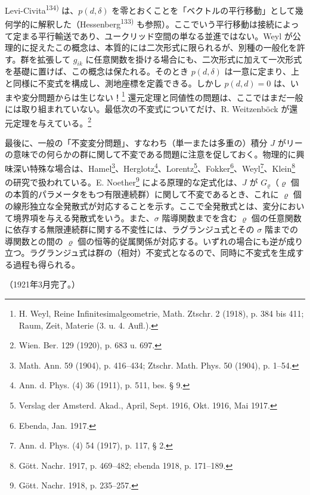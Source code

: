 \documentclass[11pt]{article}
\begin{document}
Levi-Civita\textsuperscript{134)} は、$p(d,\delta)$ を零とおくことを「ベクトルの平行移動」として幾何学的に解釈した（Hessenberg\textsuperscript{133)} も参照）。ここでいう平行移動は接続によって定まる平行輸送であり、ユークリッド空間の単なる並進ではない。Weyl が公理的に捉えたこの概念は、本質的には二次形式に限られるが、別種の一般化を許す。群を拡張して $g_{ik}$ に任意関数を掛ける場合にも、二次形式に加えて一次形式を基礎に置けば、この概念は保たれる。そのとき $p(d,\delta)$ は一意に定まり、上と同様に不変式を構成し、測地座標を定義できる。しかし $p(d,d)=0$ は、いまや変分問題からは生じない！\footnote{H. Weyl, Reine Infinitesimalgeometrie, Math. Ztschr. 2 (1918), p. 384 bis 411; Raum, Zeit, Materie (3. u. 4. Aufl.).} 還元定理と同値性の問題は、ここではまだ一般には取り組まれていない。最低次の不変式についてだけ、R. Weitzenböck が還元定理を与えている。\footnote{Wien. Ber. 129 (1920), p. 683 u. 697.}

最後に、一般の「不変変分問題」、すなわち（単一または多重の）積分 $J$ がリーの意味での何らかの群に関して不変である問題に注意を促しておく。物理的に興味深い特殊な場合は、Hamel\footnote{Math. Ann. 59 (1904), p. 416--434; Ztschr. Math. Phys. 50 (1904), p. 1--54.}、Herglotz\footnote{Ann. d. Phys. (4) 36 (1911), p. 511, bes. § 9.}、Lorentz\footnote{Verslag der Amsterd. Akad., April, Sept. 1916, Okt. 1916, Mai 1917.}、Fokker\footnote{Ebenda, Jan. 1917.}、Weyl\footnote{Ann. d. Phys. (4) 54 (1917), p. 117, § 2.}、Klein\footnote{Gött. Nachr. 1917, p. 469--482; ebenda 1918, p. 171--189.} の研究で扱われている。E. Noether\footnote{Gött. Nachr. 1918, p. 235--257.} による原理的な定式化は、$J$ が $G_\varrho$（$\varrho$ 個の本質的パラメータをもつ有限連続群）に関して不変であるとき、これに $\varrho$ 個の線形独立な全発散式が対応することを示す。ここで全発散式とは、変分において境界項を与える発散式をいう。また、$\sigma$ 階導関数までを含む $\varrho$ 個の任意関数に依存する無限連続群に関する不変性には、ラグランジ\nolinebreak[4]ュ式とその $\sigma$ 階までの導関数との間の $\varrho$ 個の恒等的従属関係が対応する。いずれの場合にも逆が成り立つ。ラグランジ\nolinebreak[4]ュ式は群の（相対）不変式となるので、同時に不変式を生成する過程も得られる。

\begin{center}
（1921年3月完了。）
\end{center}
\endgroup

\clearpage
\setcounter{footnote}{0}
\end{document}
